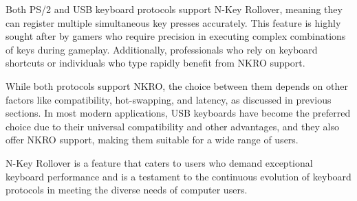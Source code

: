 Both PS/2 and USB keyboard protocols support N-Key Rollover, meaning they can register multiple simultaneous key presses accurately. This feature is highly sought after by gamers who require precision in executing complex combinations of keys during gameplay. Additionally, professionals who rely on keyboard shortcuts or individuals who type rapidly benefit from NKRO support.

While both protocols support NKRO, the choice between them depends on other factors like compatibility, hot-swapping, and latency, as discussed in previous sections. In most modern applications, USB keyboards have become the preferred choice due to their universal compatibility and other advantages, and they also offer NKRO support, making them suitable for a wide range of users.

N-Key Rollover is a feature that caters to users who demand exceptional keyboard performance and is a testament to the continuous evolution of keyboard protocols in meeting the diverse needs of computer users.


